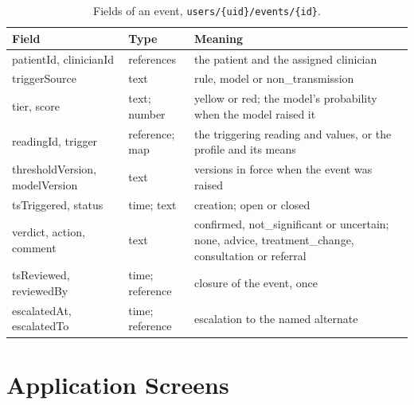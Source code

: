 \documentclass[11pt,a4paper,oneside]{report}
\begin{document}
\begin{table}[htbp]
\centering\footnotesize
\caption{Fields of an event, \texttt{users/\{uid\}/events/\{id\}}.}\label{tab:schema-event}
\begin{tabularx}{\textwidth}{@{}>{\ttfamily\raggedright\arraybackslash}p{3.4cm} >{\raggedright\arraybackslash}p{2.1cm} X@{}}
\toprule
\normalfont\textbf{Field} & \textbf{Type} & \textbf{Meaning} \\
\midrule
patientId, clinicianId & references & the patient and the assigned clinician \\
triggerSource & text & rule, model or non\_transmission \\
tier, score & text; number & yellow or red; the model's probability when the model raised it \\
readingId, trigger & reference; map & the triggering reading and values, or the profile and its means \\
thresholdVersion, modelVersion & text & versions in force when the event was raised \\
tsTriggered, status & time; text & creation; open or closed \\
verdict, action, comment & text & confirmed, not\_significant or uncertain; none, advice, treatment\_change, consultation or referral \\
tsReviewed, reviewedBy & time; reference & closure of the event, once \\
escalatedAt, escalatedTo & time; reference & escalation to the named alternate \\
\bottomrule
\end{tabularx}
\end{table}

\chapter{Application Screens}\label{app:screens}
\end{document}

